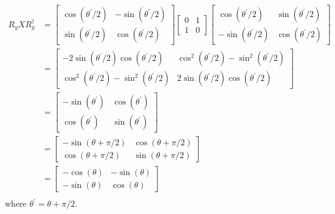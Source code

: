 \documentclass[11pt, oneside]{article}   	%
\begin{document}
\begin{align}
R_y X R^{\dagger}_y
&= 
\begin{bmatrix}
\cos(\theta^{\prime}/2) & -\sin(\theta^{\prime}/2) \\
\sin(\theta^{\prime}/2) & \cos(\theta^{\prime}/2)
\end{bmatrix}
\begin{bmatrix}
0 & 1 \\
1 & 0 
\end{bmatrix}
\begin{bmatrix}
\cos(\theta^{\prime}/2) & \sin(\theta^{\prime}/2) \\
- \sin(\theta^{\prime}/2) & \cos(\theta^{\prime}/2)
\end{bmatrix} \\
&=
\begin{bmatrix}
-2 \sin(\theta^{\prime}/2) \cos(\theta^{\prime}/2) & \cos^2(\theta^{\prime}/2) - \sin^2(\theta^{\prime}/2) \\
\cos^2(\theta^{\prime}/2) - \sin^2(\theta^{\prime}/2) & 2 \sin(\theta^{\prime}/2) \cos(\theta^{\prime}/2)
\end{bmatrix} \\
&=
\begin{bmatrix}
- \sin(\theta^{\prime}) & \cos(\theta^{\prime}) \\
\cos(\theta^{\prime}) & \sin(\theta^{\prime})
\end{bmatrix} \\
&=
\begin{bmatrix}
- \sin(\theta + \pi/2) & \cos(\theta + \pi/2) \\
\cos(\theta + \pi/2) & \sin(\theta + \pi/2)
\end{bmatrix} \\
&=
\begin{bmatrix}
- \cos(\theta) & -\sin(\theta) \\
-\sin(\theta) & \cos(\theta)
\end{bmatrix} \\
\end{align}
where $\theta^{\prime} = \theta + \pi/2$.
\end{document}
